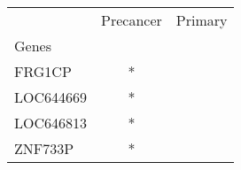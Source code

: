 \begin{tabular}{lcc}
\toprule
{} & Precancer & Primary \\
Genes     &           &         \\
\midrule
FRG1CP    &         * &         \\
LOC644669 &         * &         \\
LOC646813 &         * &         \\
ZNF733P   &         * &         \\
\bottomrule
\end{tabular}
